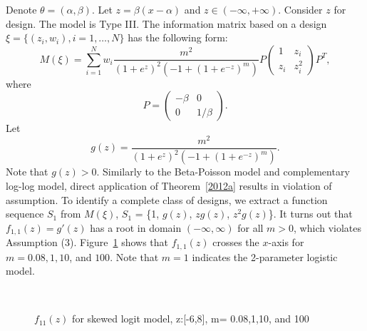 \documentclass[12pt]{amsart}
\theoremstyle{definition}
\theoremstyle{remark}
\numberwithin{equation}{section}
\begin{document}
Denote $\theta = (\alpha,\beta)$. Let $z = \beta(x-\alpha)$ and $z\in (-\infty,+\infty)$. Consider $z$ for design. The model is Type III. The information matrix based on a design $\xi = \{(z_i,w_i), i=1, \ldots, N\}$ has the following form: \begin{equation}
M(\xi) = \sum_{i=1}^{N} w_i \frac{m^2}{(1+e^z)^2(-1+(1+e^{-z})^m)}P \left( \begin{array}{cc}
1 & z_i\\
z_i & z_i^2
\end{array} \right) P^T,
\end{equation} where \[P = \left( \begin{array}{cc}
-\beta & 0\\
0 & 1/\beta
\end{array} \right).\] 
Let \[g(z) =  \frac{m^2}{(1+e^z)^2(-1+(1+e^{-z})^m)}.\] Note that $g(z)>0$.  Similarly to the Beta-Poisson model and complementary log-log model, direct application of Theorem~\ref{2012a} results in violation of assumption. To identify a complete class of designs, we extract a function sequence $S_1$ from $M(\xi)$,  $S_1$ = \{1, $g(z)$, $zg(z)$, $z^2g(z)$\}. It turns out that $f_{1,1}(z) = g'(z)$ has a root in domain $(-\infty,\infty)$ for all $m>0$, which violates Assumption (3). Figure~\ref{fig:skewedlogit_before} shows that $f_{1,1}(z) $ crosses the $x$-axis for $m = 0.08, 1, 10$, and $100$. Note that $m=1$ indicates the 2-parameter logistic model.  
\begin{figure}[ht]
\\
\caption{$f_{11}(z)$ for skewed logit model, z:[-6,8], m= 0.08,1,10, and 100}
\label{fig:skewedlogit_before}
\end{figure}
\end{document}
